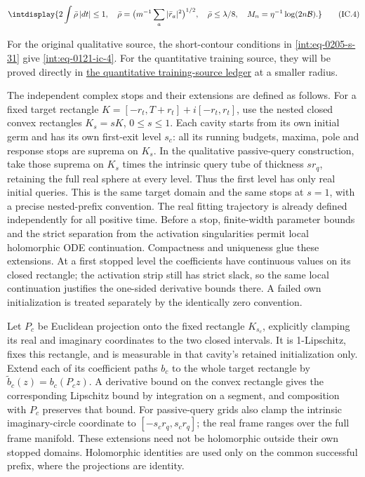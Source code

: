 \begingroup\renewcommand{\theHequation}{intdisplay.297}
\begin{equation}
\intdisplay{
2\int\bar\rho\,|dt|\le1,\quad
 \bar\rho=\big(m^{-1}\sum_a|\bar r_a|^2\big)^{1/2},\quad
 \bar\rho\le\lambda/8,\quad
 M_n=\eta^{-1}\log(2n\mathcal B).
}
\tag{IC.4}
\label{int:eq-0121-ic-4}
\end{equation}
\endgroup


For the original qualitative source, the short-contour conditions in \eqref{int:eq-0205-s-31} give \eqref{int:eq-0121-ic-4}. For the quantitative training source, they will be proved directly in \hyperref[int:source-quantitative-ledger]{the quantitative training-source ledger} at a smaller radius.



The independent complex stops and their extensions are defined as follows. For a fixed target rectangle \(K=[-r_t,\allowbreak T+r_t]+i[-r_t,\allowbreak r_t]\), use the nested closed convex rectangles \(K_s=sK\), \(0\le s\le1\). Each cavity starts from its own initial germ and has its own first-exit level \(s_c\): all its running budgets, maxima, pole and response stops are suprema on \(K_s\). In the qualitative passive-query construction, take those suprema on \(K_s\) times the intrinsic query tube of thickness \(s r_q\), retaining the full real sphere at every level. Thus the first level has only real initial queries. This is the same target domain and the same stops at \(s=1\), with a precise nested-prefix convention. The real fitting trajectory is already defined independently for all positive time. Before a stop, finite-width parameter bounds and the strict separation from the activation singularities permit local holomorphic ODE continuation. Compactness and uniqueness glue these extensions. At a first stopped level the coefficients have continuous values on its closed rectangle; the activation strip still has strict slack, so the same local continuation justifies the one-sided derivative bounds there. A failed own initialization is treated separately by the identically zero convention.



Let \(P_c\) be Euclidean projection onto the fixed rectangle \(K_{s_c}\), explicitly clamping its real and imaginary coordinates to the two closed intervals. It is 1-Lipschitz, fixes this rectangle, and is measurable in that cavity's retained initialization only. Extend each of its coefficient paths \(b_c\) to the whole target rectangle by \(\widetilde b_c(z)=b_c(P_cz)\). A derivative bound on the convex rectangle gives the corresponding Lipschitz bound by integration on a segment, and composition with \(P_c\) preserves that bound. For passive-query grids also clamp the intrinsic imaginary-circle coordinate to \([-s_cr_q,\allowbreak s_cr_q]\); the real frame ranges over the full frame manifold. These extensions need not be holomorphic outside their own stopped domains. Holomorphic identities are used only on the common successful prefix, where the projections are identity.


